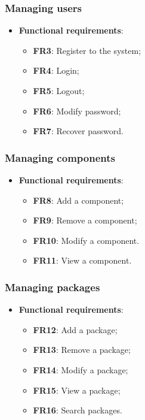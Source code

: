 \documentclass[a4paper,12pt]{book}
\begin{document}
\subsubsection{Managing users}
\begin{itemize}
  \item \textbf{Functional requirements}:
  \begin{itemize}[noitemsep]
    \item \textbf{FR3}: Register to the system;
    \item \textbf{FR4}: Login;
    \item \textbf{FR5}: Logout;
    \item \textbf{FR6}: Modify password;
    \item \textbf{FR7}: Recover password.
  \end{itemize}
\end{itemize}

\subsubsection{Managing components}
\begin{itemize}
  \item \textbf{Functional requirements}:
  \begin{itemize}[noitemsep]
    \item \textbf{FR8}: Add a component;
    \item \textbf{FR9}: Remove a component;
    \item \textbf{FR10}: Modify a component.
    \item \textbf{FR11}: View a component.
  \end{itemize}
\end{itemize}

\subsubsection{Managing packages}
\begin{itemize}
  \item \textbf{Functional requirements}:
  \begin{itemize}[noitemsep]
    \item \textbf{FR12}: Add a package;
    \item \textbf{FR13}: Remove a package;
    \item \textbf{FR14}: Modify a package;
    \item \textbf{FR15}: View a package;
    \item \textbf{FR16}: Search packages.
  \end{itemize}
\end{itemize}
\end{document}
